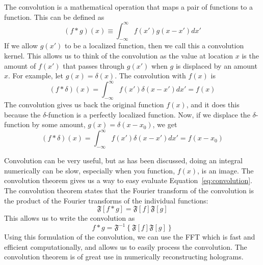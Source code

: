             The convolution is a mathematical operation that maps a pair of
            functions to a function. This can be defined as
            \begin{equation}
                (f*g)(x) \equiv \int_{-\infty}^{\infty} f(x')g(x-x')dx'
                \label{eq:convolution}
            \end{equation}
            If we allow $g(x')$ to be a localized function, then we call this a
            convolution kernel.
            This allows us to think of the convolution
            as the value at location $x$ is the amount of $f(x')$ that passes
            through $g(x')$ when $g$ is displaced by an amount $x$. For example,
            let $g(x) = \delta(x)$. The convolution with $f(x)$ is
            \begin{equation}
                (f*\delta)(x)=\int_{-\infty}^{\infty}f(x')\delta(x-x')dx'=f(x)
            \end{equation}
            The convolution gives us back the original function $f(x)$, and it
            does this because the $\delta$-function is a perfectly localized
            function. Now, if we displace the $\delta$-function by some amount, $g(x)=\delta(x-x_0)$,
            we get
            \begin{equation}
                (f*\delta)(x)=\int_{-\infty}^{\infty}f(x')\delta(x-x')dx'=f(x-x_0)
            \end{equation}

            Convolution can be very useful, but as has been discussed, doing an
            integral numerically can be slow, especially when you function, $f(x)$,
            is an image. The convolution theorem gives us a way to easy evaluate
            Equation~\ref{eq:convolution}. The convolution theorem states that the
            Fourier transform of the convolution is the product of the Fourier
            transforms of the individual functions:
            \begin{equation}
                \mathfrak{F}\left[ f*g
                \right]=\mathfrak{F}[f]\mathfrak{F}[g]
            \end{equation}
            This allows us to write the convolution as
            \begin{equation}
                f*g = \mathfrak{F}^{-1}\left\{\mathfrak{F}[f]\mathfrak{F}[g] \right\}
            \end{equation}
            Using this formulation of the convolution, we can use the FFT which is
            fast and efficient computationally, and allows us to easily process the
            convolution. The convolution theorem is of great use in numerically
            reconstructing holograms.

